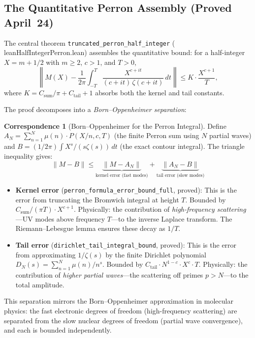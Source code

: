 \documentclass[11pt,a4paper]{article}
\theoremstyle{definition}
\newtheorem{correspondence}[definition]{Correspondence}
\newcommand{\lean}[1]{\texttt{#1}}
\begin{document}
\subsection{The Quantitative Perron Assembly (Proved April~24)}

The central theorem \lean{truncated\_perron\_half\_integer}
(\\lean{HalfIntegerPerron.lean}) assembles the quantitative bound:
for a half-integer $X = m + 1/2$ with $m \geq 2$, $c > 1$, and $T > 0$,
\[
  \left\| M(X) - \frac{1}{2\pi} \int_{-T}^{T}
  \frac{X^{c+it}}{(c+it)\,\zeta(c+it)}\,dt \right\|
  \leq K \cdot \frac{X^{c+1}}{T},
\]
where $K = C_{\mathrm{sum}}/\pi + C_{\mathrm{tail}} + 1$ absorbs
both the kernel and tail constants.

The proof decomposes into a \emph{Born--Oppenheimer separation}:

\begin{correspondence}[Born--Oppenheimer for the Perron Integral]
\label{corr:born-oppenheimer}
Define $A_N = \sum_{n=1}^{N} \mu(n) \cdot P(X/n, c, T)$ (the finite
Perron sum using $N$ partial waves) and $B = (1/2\pi)\int X^s/(s\zeta(s))\,dt$
(the exact contour integral). The triangle inequality gives:
\[
  \|M - B\| \leq \underbrace{\|M - A_N\|}_{\text{kernel error (fast modes)}}
  + \underbrace{\|A_N - B\|}_{\text{tail error (slow modes)}}
\]
\begin{itemize}
  \item \textbf{Kernel error} (\lean{perron\_formula\_error\_bound\_full},
    proved): This is the error from truncating the Bromwich integral at
    height $T$. Bounded by $C_{\mathrm{sum}}/(\pi T) \cdot X^{c+1}$.
    Physically: the contribution of \emph{high-frequency scattering}---UV
    modes above frequency $T$---to the inverse Laplace transform. The
    Riemann--Lebesgue lemma ensures these decay as $1/T$.

  \item \textbf{Tail error} (\lean{dirichlet\_tail\_integral\_bound},
    proved): This is the error from approximating $1/\zeta(s)$ by
    the finite Dirichlet polynomial $D_N(s) = \sum_{n=1}^{N} \mu(n)/n^s$.
    Bounded by $C_{\mathrm{tail}} \cdot N^{1-c} \cdot X^c \cdot T$.
    Physically: the contribution of \emph{higher partial waves}---the
    scattering off primes $p > N$---to the total amplitude.
\end{itemize}
This separation mirrors the Born--Oppenheimer approximation in molecular
physics: the fast electronic degrees of freedom (high-frequency scattering)
are separated from the slow nuclear degrees of freedom (partial wave convergence),
and each is bounded independently.
\end{correspondence}
\end{document}

